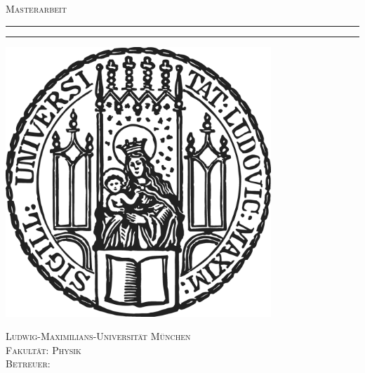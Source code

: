 \begin{titlepage}
    \begin{center}
        \thispagestyle{empty}

        \textsc{\Large Masterarbeit}


        \rule{\linewidth}{.2em}\vspace*{-0.1cm}
        \begin{center}

            \fontsize{30pt}{25pt}\selectfont \germantitle

        \end{center}\vspace*{-0.1cm}
        \rule{\linewidth}{.2em}

        \textsc{\Large \authorname}


        \includegraphics[width=10cm]{figures/lmu_logo}


        \textsc{\linespread{1}\large
        Ludwig-Maximilians-Universität München\\
        Fakultät: Physik\\
        Betreuer: \supervisor\\
        \vspace{\baselineskip}
        \germansubmissiondate
        }
    \end{center}
    \afterpage{\blankpage}
    \newpage
\end{titlepage}
